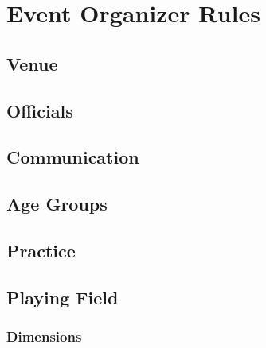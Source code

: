 \chapter{Event Organizer Rules}

\section{Venue}

\section{Officials}

\section{Communication}

\section{Age Groups}

\section{Practice}

\section{Playing Field}

\subsection{Dimensions}

